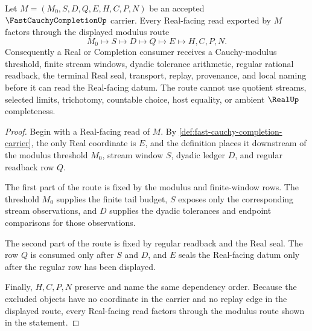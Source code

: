 \begin{theorem}
\label{thm:fast-cauchy-completion-modulus-real-seal}
Let $M=(M_0,S,D,Q,E,H,C,P,N)$ be an accepted $\FastCauchyCompletionUp$ carrier. Every Real-facing read exported by $M$ factors through the displayed modulus route
$$
M_0 \longmapsto S \longmapsto D \longmapsto Q \longmapsto E \longmapsto H,C,P,N .
$$
Consequently a Real or Completion consumer receives a Cauchy-modulus threshold, finite stream windows, dyadic tolerance arithmetic, regular rational readback, the terminal Real seal, transport, replay, provenance, and local naming before it can read the Real-facing datum. The route cannot use quotient streams, selected limits, trichotomy, countable choice, host equality, or ambient $\RealUp$ completeness.
\end{theorem}
\begin{proof}
Begin with a Real-facing read of $M$. By \autoref{def:fast-cauchy-completion-carrier}, the only Real coordinate is $E$, and the definition places it downstream of the modulus threshold $M_0$, stream window $S$, dyadic ledger $D$, and regular readback row $Q$.

The first part of the route is fixed by the modulus and finite-window rows. The threshold $M_0$ supplies the finite tail budget, $S$ exposes only the corresponding stream observations, and $D$ supplies the dyadic tolerances and endpoint comparisons for those observations.

The second part of the route is fixed by regular readback and the Real seal. The row $Q$ is consumed only after $S$ and $D$, and $E$ seals the Real-facing datum only after the regular row has been displayed.

Finally, $H,C,P,N$ preserve and name the same dependency order. Because the excluded objects have no coordinate in the carrier and no replay edge in the displayed route, every Real-facing read factors through the modulus route shown in the statement.
\end{proof}

